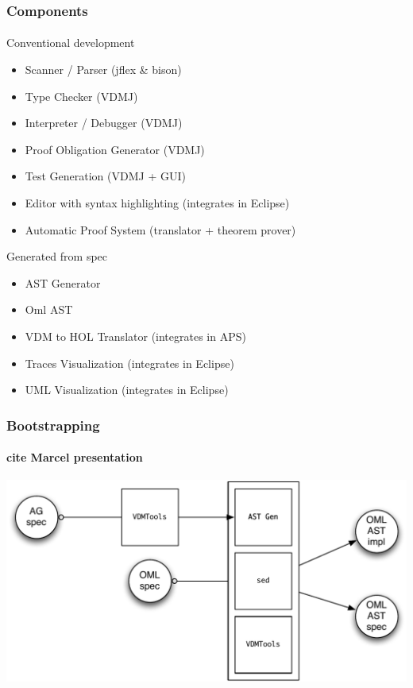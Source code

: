 \documentclass[slidestop,uncompress,mathserif,notes]{beamer}
\begin{document}
\begin{frame}
  \frametitle{Components}
  \framesubtitle{}

  \begin{block}{Conventional development}
	{\scriptsize \begin{itemize}
		\item Scanner / Parser (jflex \& bison)
		\item Type Checker (VDMJ)
		\item Interpreter / Debugger (VDMJ)
		\item Proof Obligation Generator (VDMJ)
		\item Test Generation (VDMJ + GUI)
		\item Editor with syntax highlighting (integrates in Eclipse)
		\item Automatic Proof System (translator + theorem prover)
	  \end{itemize}}
  \end{block}
%  
  \begin{block}{Generated from spec}
	{\scriptsize \begin{itemize}
	  	\item AST Generator
		\item Oml AST
		\item VDM to HOL Translator (integrates in APS)
		\item Traces Visualization (integrates in Eclipse)
		\item UML Visualization (integrates in Eclipse)
	  \end{itemize}}
  \end{block}

\end{frame}

\begin{frame}
  \frametitle{Bootstrapping}
  \framesubtitle{cite Marcel presentation}


  \begin{center}
    \includegraphics[width=\textwidth]{images/ast_gen_oml_ast_gen.pdf}
  \end{center}

\end{frame}
\end{document}
